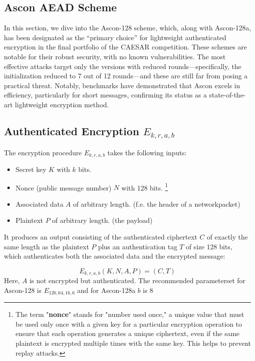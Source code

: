 \subsection{Ascon AEAD Scheme} %
In this section, we dive into the Ascon-128 scheme, which, along with Ascon-128a, has been designated as the “primary choice” for lightweight authenticated encryption in the final portfolio of the CAESAR competition. These schemes are notable for their robust security, with no known vulnerabilities. The most effective attacks target only the versions with reduced rounds—specifically, the initialization reduced to 7 out of 12 rounds—and these are still far from posing a practical threat. Notably, benchmarks have demonstrated that Ascon excels in efficiency, particularly for short messages, confirming its status as a state-of-the-art lightweight encryption method. \cite[Chapter 1]{Ascon-v1.2}


\subsection{Authenticated Encryption $E_{k,r,a,b}$}
The encryption procedure $E_{k,r,a,b}$ takes the following inputs:
\begin{itemize}
    \item Secret key $K$ with $k$ bits.
    \item Nonce (public message number) $N$ with 128 bits. \footnote[2]{The term "\textbf{nonce}" stands for "number used once," a unique value that must be used only once with a given key for a particular encryption operation to ensure that each operation generates a unique ciphertext, even if the same plaintext is encrypted multiple times with the same key. This helps to prevent replay attacks.}
    \item Associated data $A$ of arbitrary length. (f.e. the header of a networkpacket)
    \item Plaintext $P$ of arbitrary length. (the payload)
\end{itemize}
It produces an output consisting of the authenticated ciphertext $C$ of exactly the same length as the plaintext $P$ plus an authentication tag $T$ of size 128 bits, which authenticates both the associated data and the encrypted message:

\[
E_{k,r,a,b}(K,N,A,P) = (C,T)
\]
Here, $A$ is not encrypted but authenticated. 
The recommended parameterset for Ascon-128 is $E_{126,64,16,6}$ and for Ascon-128a $b$ is 8 \cite{Ascon-v1.2}


